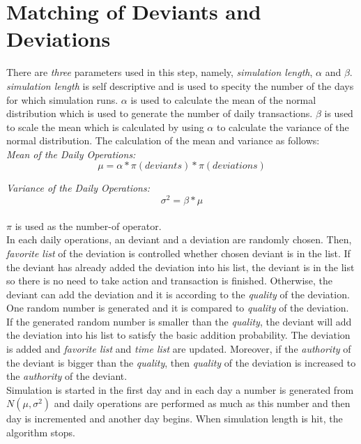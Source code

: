 \documentclass[12pt,a4paper]{report}
\begin{document}
\clearpage

\section{Matching of Deviants and Deviations}	
	
	\hspace{0.6cm}There are \emph{three} parameters used in this step, namely, \emph{simulation length},  $\alpha$ and $\beta$. \emph{simulation length} is self descriptive and is used to specity the number of the days for which simulation runs. $\alpha$ is used to calculate the mean of the normal distribution which is used to generate the number of daily transactions. $\beta$ is used to scale the mean which is calculated by using $\alpha$ to calculate the variance of the normal distribution. The calculation of the mean and variance as follows: \\

\emph{Mean of the Daily Operations: }
$$ \mu = \alpha * \pi(deviants) * \pi(deviations)$$

\emph{Variance of the Daily Operations:}
$$ \sigma^2 =  \beta * \mu $$ \\

$\pi$ is used as the number-of operator. \\

	In each daily operations, an deviant and a deviation are randomly chosen. Then, \emph{favorite list} of the deviation is controlled whether chosen deviant is in the list. If the deviant has already added the deviation into his list, the deviant is in the list so there is no need to take action and transaction is finished. Otherwise, the deviant can add the deviation and it is according to the \emph{quality} of the deviation. One random number is generated and it is compared to \emph{quality} of the deviation. If the generated random number is smaller than the \emph{quality}, the deviant will add the deviation into his list to satisfy the basic addition probability. The deviation is added and \emph{favorite list} and \emph{time list} are updated. Moreover, if the \emph{authority} of the deviant is bigger than the \emph{quality}, then \emph{quality}  of the deviation is increased to the \emph{authority} of the deviant. \\

	Simulation is started in the first day and in each day a number is generated from $N(\mu, \sigma^2)$  and daily operations are performed as much as this number and then day is incremented and another day begins. When simulation length is hit, the algorithm stops.
\end{document}
